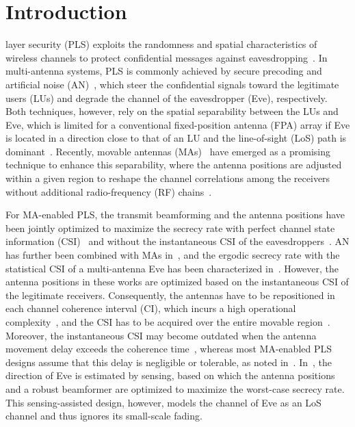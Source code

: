 \documentclass[journal]{IEEEtran}
\begin{document}
\IEEEpeerreviewmaketitle

\section{Introduction}\label{sec:intro}
 layer security (PLS) exploits the randomness and spatial characteristics of wireless channels to protect confidential messages against eavesdropping~\cite{Wyner1975,Mukherjee2014,WuJSAC2018}. In multi-antenna systems, PLS is commonly achieved by secure precoding and artificial noise (AN)~\cite{Goel2008,Zhou2010}, which steer the confidential signals toward the legitimate users (LUs) and degrade the channel of the eavesdropper (Eve), respectively. Both techniques, however, rely on the spatial separability between the LUs and Eve, which is limited for a conventional fixed-position antenna (FPA) array if Eve is located in a direction close to that of an LU and the line-of-sight (LoS) path is dominant~\cite{Mukherjee2014,HuSPL2024}. Recently, movable antennas (MAs)~\cite{ZhuMag2024,ZhuTWC2024Model} have emerged as a promising technique to enhance this separability, where the antenna positions are adjusted within a given region to reshape the channel correlations among the receivers without additional radio-frequency (RF) chains~\cite{MaTWC2024,ZhuTWC2024MU,ZhuCL2023}.

For MA-enabled PLS, the transmit beamforming and the antenna positions have been jointly optimized to maximize the secrecy rate with perfect channel state information (CSI)~\cite{HuSPL2024} and without the instantaneous CSI of the eavesdroppers~\cite{HuTMC2024}. AN has further been combined with MAs in~\cite{TangTCOM2025,ChengArxiv2024}, and the ergodic secrecy rate with the statistical CSI of a multi-antenna Eve has been characterized in~\cite{XieArxiv2026}. However, the antenna positions in these works are optimized based on the instantaneous CSI of the legitimate receivers. Consequently, the antennas have to be repositioned in each channel coherence interval (CI), which incurs a high operational complexity~\cite{ZhengTCOM2025}, and the CSI has to be acquired over the entire movable region~\cite{HuTVT2025}. Moreover, the instantaneous CSI may become outdated when the antenna movement delay exceeds the coherence time~\cite{ChenArxiv2025EE}, whereas most MA-enabled PLS designs assume that this delay is negligible or tolerable, as noted in~\cite{YuArxiv2025}. In~\cite{ChenArxiv2026}, the direction of Eve is estimated by sensing, based on which the antenna positions and a robust beamformer are optimized to maximize the worst-case secrecy rate. This sensing-assisted design, however, models the channel of Eve as an LoS channel and thus ignores its small-scale fading.
\end{document}
